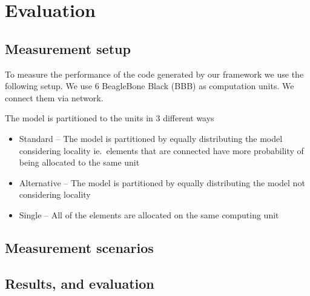 
\chapter{Evaluation}


\section{Measurement setup}

To measure the performance of the code generated by our framework we use the following setup. We use 6 BeagleBone Black (BBB) \cite{BBB} as computation units. We connect them via network. 

The model is partitioned to the units in 3 different ways 
\begin{itemize}
	\item Standard -- The model is partitioned by equally distributing the model considering locality ie.\ elements that are connected have more probability of being allocated to the same unit
	\item Alternative -- The model is partitioned by equally distributing the model not considering locality
	\item Single -- All of the elements are allocated on the same computing unit
\end{itemize}

\section{Measurement scenarios}








\section{Results, and evaluation}
